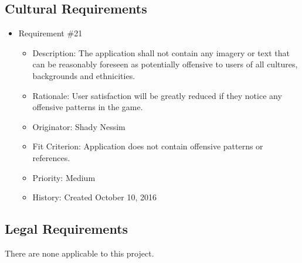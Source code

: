 \documentclass[12pt, titlepage]{article}
\begin{document}
\subsection{Cultural Requirements}
\begin{itemize}

\item Requirement \#21
\begin{itemize} 
\item Description: The application shall not contain any imagery or text that can be reasonably foreseen as potentially oﬀensive to users of all cultures, backgrounds and ethnicities. 
\item Rationale: User satisfaction will be greatly reduced if they notice any offensive patterns in the game. 
\item Originator: Shady Nessim
\item Fit Criterion: Application does not contain offensive patterns or references. 
\item Priority: Medium 
\item History: Created October 10, 2016
\end{itemize}

\end{itemize}

\subsection{Legal Requirements}
There are none applicable to this project.
\end{document}
